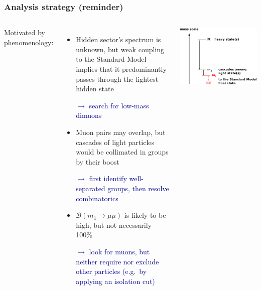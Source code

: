 \documentclass[compress]{beamer}
\begin{document}
\begin{frame}
\frametitle{Analysis strategy (reminder)}
\begin{columns}
Motivated by phenomenology:
\begin{itemize}
\item Hidden sector's spectrum is unknown, but weak coupling to
  the Standard Model implies that it predominantly passes through the lightest
  hidden state

\textcolor{darkblue}{$\longrightarrow$ search for low-mass dimuons}

\item Muon pairs may overlap, but cascades of light particles would
  be collimated in groups by their boost

\textcolor{darkblue}{$\longrightarrow$ first identify well-separated groups, then
  resolve combinatorics}

\item $\mathcal{B}(m_1 \to \mu\mu)$ is likely to be high, but not
  necessarily 100\%

\textcolor{darkblue}{$\longrightarrow$ look for muons, but neither
  require nor exclude other particles (e.g.\ by applying an isolation cut)}
\end{itemize}

\includegraphics[width=\linewidth]{basic_picture4.pdf}


\end{columns}
\end{frame}
\end{document}
